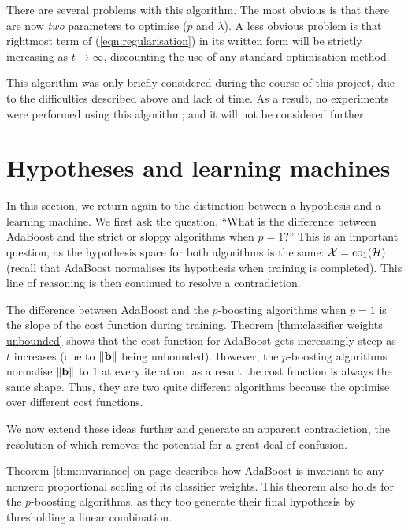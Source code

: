 There are several problems with this algorithm.  The most obvious is that
there are now \emph{two} parameters to optimise ($p$ and $\lambda$).
A less obvious problem is that rightmost term of
(\ref{eqn:regularisation}) in its written form will be strictly
increasing as $t \rightarrow \infty$, discounting the use of any
standard optimisation method.

This algorithm was only briefly considered during the course of this
project, due to the difficulties described above and lack of time.  As
a result, no experiments were performed using this algorithm; and it
will not be considered further.

\section{Hypotheses and learning machines}

In this section, we return again to the distinction between a
hypothesis and a learning machine.  We first ask the question, ``What
is the difference between AdaBoost and the strict or sloppy algorithms
when $p=1$?''  This is an important question, as the hypothesis space
for both algorithms is the same: $\mathcal{X} = \mathrm{co}_1(\mathcal{H})$ (recall that
AdaBoost normalises its hypothesis when training is completed).  This
line of reasoning is then continued to resolve a contradiction.

The difference between AdaBoost and the $p$-boosting algorithms when
$p=1$ is the slope of the cost function during training.
Theorem \ref{thm:classifier weights unbounded} shows that the cost
function for AdaBoost gets increasingly steep as $t$ increases (due to
$\|\mathbf{b}\|$ being unbounded).  However, the $p$-boosting algorithms
normalise $\|\mathbf{b}\|$ to 1 at every iteration; as a result the cost
function is always the same shape.  Thus, they are two quite different
algorithms because the optimise over different cost functions.

We now extend these ideas further and generate an apparent
contradiction, the resolution of which removes the potential for a
great deal of confusion.

Theorem \ref{thm:invariance} on page \pageref{thm:invariance}
describes how AdaBoost is invariant to any nonzero proportional
scaling of its classifier weights.  This theorem also holds for the
$p$-boosting algorithms, as they too generate their final hypothesis
by thresholding a linear combination.


